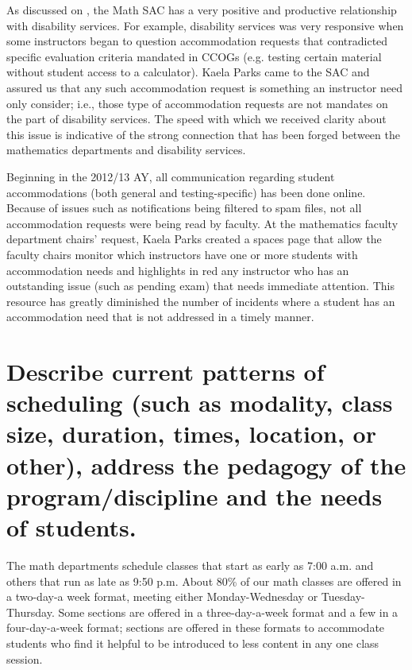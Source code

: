 
As discussed on ,
the Math SAC has a very positive and productive relationship with disability
services.  For example, disability services was very responsive when some
instructors began to question accommodation requests that contradicted specific
evaluation criteria mandated in CCOGs (e.g. testing certain material without
student access to a calculator).  Kaela Parks came to the SAC and assured us
that any such accommodation request is something an instructor need only
consider; i.e., those type of accommodation requests are not mandates on the
part of disability services.  The speed with which we received clarity about
this issue is indicative of the strong connection that has been forged between
the mathematics departments and disability services.

Beginning in the 2012/13 AY, all communication regarding student accommodations
(both general and testing-specific) has been done online.
Because of issues such as notifications being filtered to spam files, not all
accommodation requests were being read by faculty.  At the  mathematics faculty
department chairs' request, Kaela Parks created a spaces page that allow the
faculty chairs monitor which instructors have one or more students with
accommodation needs and highlights in red any instructor who has an outstanding
issue (such as pending exam) that needs immediate attention.  This resource has
greatly diminished the number of incidents where a student has an
accommodation need that is not addressed in a timely manner.

\section[Patterns of scheduling]{Describe current patterns of scheduling (such as modality, class size, duration, times, location, or other),  address the pedagogy of the program/discipline and the needs of students.} 
\label{facilities:sec:scheduling}
The math departments schedule classes that start as early as 7:00 a.m. and
others that run as late as 9:50 p.m.  About 80\% of our math classes are offered
in a two-day-a week format, meeting either Monday-Wednesday or
Tuesday-Thursday.  Some sections are offered in a three-day-a-week format and a
few in a four-day-a-week format; sections are offered in these formats to
accommodate students who find it helpful to be introduced to less content in
any one class session.  

